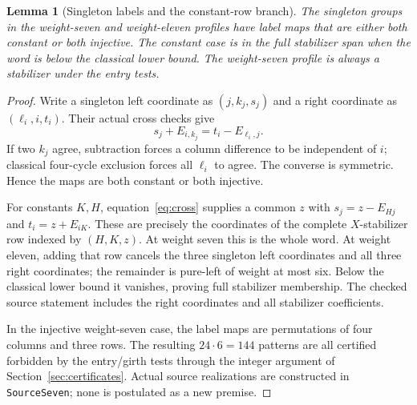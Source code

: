 \documentclass[11pt]{article}
\newtheorem{lemma}[theorem]{Lemma}
\theoremstyle{definition}\newtheorem{definition}[theorem]{Definition}
\begin{document}
\begin{lemma}[Singleton labels and the constant-row branch]\label{lem:singleton}
The singleton groups in the weight-seven and weight-eleven profiles have
label maps that are either both constant or both injective. The constant
case is in the full stabilizer span when the word is below the classical
lower bound. The weight-seven profile is always a stabilizer under the
entry tests.
\end{lemma}
\begin{proof}
Write a singleton left coordinate as $(j,k_j,s_j)$ and a right coordinate
as $(\ell_i,i,t_i)$. Their actual cross checks give
\begin{equation}\label{eq:cross}
 s_j+E_{i,k_j}=t_i-E_{\ell_i,j}.
\end{equation}
If two $k_j$ agree, subtraction forces a column difference to be independent
of $i$; classical four-cycle exclusion forces all $\ell_i$ to agree.
The converse is symmetric. Hence the maps are both constant or both injective.

For constants $K,H$, equation~\eqref{eq:cross} supplies a common $z$ with
$s_j=z-E_{Hj}$ and $t_i=z+E_{iK}$. These are precisely the coordinates of
the complete $X$-stabilizer row indexed by $(H,K,z)$. At weight seven this
is the whole word. At weight eleven, adding that row cancels the three
singleton left coordinates and all three right coordinates; the remainder
is pure-left of weight at most six. Below the classical lower bound it
vanishes, proving full stabilizer membership. The checked source statement
includes the right coordinates and all stabilizer coefficients.

In the injective weight-seven case, the label maps are permutations of four
columns and three rows. The resulting $24\cdot6=144$ patterns are all
certified forbidden by the entry/girth tests through the integer argument
of Section~\ref{sec:certificates}. Actual source realizations are constructed
in \texttt{SourceSeven}; none is postulated as a new premise.
\end{proof}
\end{document}
